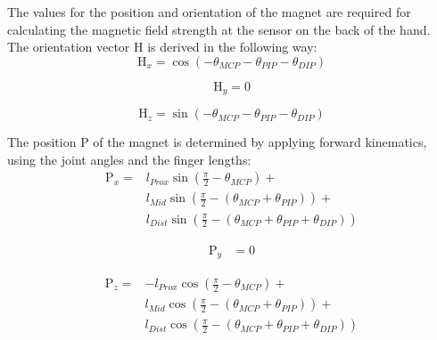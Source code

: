 The values for the position and orientation of the magnet are required for calculating the magnetic field strength at the sensor on the back of the hand.\\
The orientation vector $ \mathrm{H} $ is derived in the following way:\\
\begin{equation}\label{eq:orienX}
\mathrm{H}_{x} = \cos(-\theta_{MCP}-\theta_{PIP}-\theta_{DIP})
\end{equation}

\begin{equation}\label{eq:orienY}
\mathrm{H}_{y} = 0
\end{equation}

\begin{equation}\label{eq:orienZ}
\mathrm{H}_{z} = \sin(-\theta_{MCP}-\theta_{PIP}-\theta_{DIP})
\end{equation}

The position $ \mathrm{P} $ of the magnet is determined by applying forward kinematics, using the joint angles and the finger lengths:
\begin{equation}\label{eq:posX}
\begin{aligned}
\mathrm{P}_{x} =& l_{Prox}\sin(\frac{\pi}{2}-\theta_{MCP}) +\\
& l_{Mid}\sin(\frac{\pi}{2}-(\theta_{MCP}+\theta_{PIP})) +\\
& l_{Dist}\sin(\frac{\pi}{2}-(\theta_{MCP}+\theta_{PIP}+\theta_{DIP})) 
\end{aligned}
\end{equation}

\begin{equation}\label{eq:posY}
\begin{aligned}
\mathrm{P}_{y} &= 0
\end{aligned}
\end{equation}

\begin{equation}\label{eq:posZ}
\begin{aligned}
\mathrm{P}_{z} =& -l_{Prox}\cos(\frac{\pi}{2}-\theta_{MCP}) +\\
& l_{Mid}\cos(\frac{\pi}{2}-(\theta_{MCP}+\theta_{PIP})) +\\
& l_{Dist}\cos(\frac{\pi}{2}-(\theta_{MCP}+\theta_{PIP}+\theta_{DIP})) 
\end{aligned}
\end{equation}

